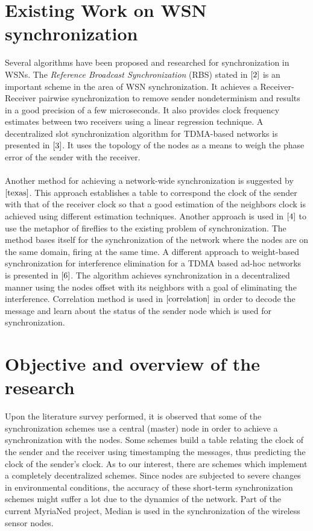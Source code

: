 \documentclass[a4paper,10pt]{report}
\begin{document}
\section{\textbf{Existing Work on WSN synchronization}}\par
Several algorithms have been proposed and researched for
synchronization in WSNs. The \textit{Reference Broadcast
Synchronization} (RBS) stated in $\cite{2}$ is an important scheme in the
area of WSN synchronization. It achieves a Receiver-Receiver
pairwise synchronization to remove sender nondeterminism and results
in a good precision of a few microseconds. It also provides clock
frequency estimates between two receivers using a linear regression
technique. A decentralized slot synchronization algorithm for
TDMA-based networks is presented in $\cite{3}$. It uses the topology
of the nodes as a means to weigh the phase error of the sender with
the receiver. \paragraph*{} Another method for achieving a
network-wide synchronization is suggested by $\cite{texas}$. This
approach establishes a table to correspond the clock of the sender
with that of the receiver clock so that a good estimation of the
neighbors clock is achieved using different estimation techniques.
Another approach is used in $\cite{4}$ to use the metaphor of
fireflies to the existing problem of synchronization. The method
bases itself for the synchronization of the network where the nodes
are on the same domain, firing at the same time. A different
approach to weight-based synchronization for interference
elimination for a TDMA based ad-hoc networks is presented in
$\cite{6}$. The algorithm achieves synchronization in a
decentralized manner using the nodes offset with its neighbors with
a goal of eliminating the interference. Correlation method is used
in $\cite{correlation}$ in order to decode the message and learn
about the status of the sender node which is used for
synchronization.
\section{\textbf{Objective and overview of the research}}
Upon the literature survey performed, it is observed that some of
the synchronization schemes use a central (master) node in order to
achieve a synchronization with the nodes. Some schemes build a table
relating the clock of the sender and the receiver using timestamping
the messages, thus predicting the clock of the sender's clock. As to
our interest, there are schemes which implement a completely
decentralized schemes. Since nodes are subjected to severe changes
in environmental conditions, the accuracy of these short-term
synchronization schemes might suffer a lot due to the dynamics of
the network. Part of the current MyriaNed project, Median is used in
the synchronization of the wireless sensor nodes.
\end{document}
